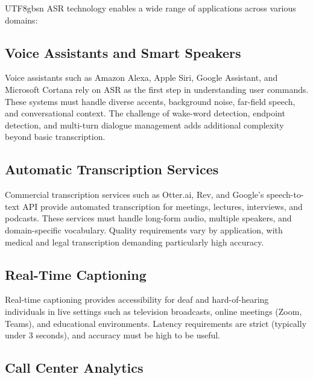 \documentclass[12pt,a4paper]{article}
\begin{document}
\begin{CJK}{UTF8}{gbsn}
ASR technology enables a wide range of applications across various domains:

\subsection{Voice Assistants and Smart Speakers}
\label{subsec:assistants}

Voice assistants such as Amazon Alexa, Apple Siri, Google Assistant, and Microsoft Cortana rely on ASR as the first step in understanding user commands. These systems must handle diverse accents, background noise, far-field speech, and conversational context. The challenge of wake-word detection, endpoint detection, and multi-turn dialogue management adds additional complexity beyond basic transcription.

\subsection{Automatic Transcription Services}
\label{subsec:transcription}

Commercial transcription services such as Otter.ai, Rev, and Google's speech-to-text API provide automated transcription for meetings, lectures, interviews, and podcasts. These services must handle long-form audio, multiple speakers, and domain-specific vocabulary. Quality requirements vary by application, with medical and legal transcription demanding particularly high accuracy.

\subsection{Real-Time Captioning}
\label{subsec:captioning}

Real-time captioning provides accessibility for deaf and hard-of-hearing individuals in live settings such as television broadcasts, online meetings (Zoom, Teams), and educational environments. Latency requirements are strict (typically under 3 seconds), and accuracy must be high to be useful.

\subsection{Call Center Analytics}
\label{subsec:callcenter}


\end{CJK}
\end{document}

